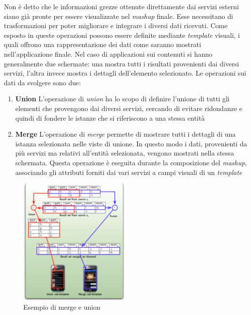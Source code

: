 Non è detto che le informazioni grezze ottenute direttamente dai servizi esterni siano già pronte per essere visualizzate nel \emph{mashup} finale. Esse necessitano di trasformazioni per poter migliorare e integrare i diversi dati ricevuti. Come esposto in \cite{caio2011tesi} queste operazioni possono essere definite mediante \emph{template} visuali, i quali offrono una rappresentazione dei dati come saranno mostrati nell'applicazione finale. Nel caso di applicazioni sui contenuti si hanno generalmente due schermate: una mostra tutti i risultati provenienti dai diversi servizi, l'altra invece mostra i dettagli dell'elemento selezionato. Le operazioni sui dati da svolgere sono due:

\begin{enumerate}
	\item \textbf{Union}
	L'operazione di \emph{union} ha lo scopo di definire l'unione di tutti gli elementi che provengono dai diversi servizi, cercando di evitare ridondanze e quindi di fondere le istanze che si riferiscono a una stessa entità
	\item \textbf{Merge}
	L'operazione di \emph{merge} permette di mostrare tutti i dettagli di una istanza selezionata nelle viste di unione. In questo modo i dati, provenienti da più servizi ma relativi all'entità selezionata, vengono mostrati nella stessa schermata. Questa operazione è eseguita durante la composizione del \emph{mashup}, associando gli attributi forniti dai vari servizi a campi visuali di un \emph{template}
\end{enumerate}

\begin{figure}[ht]
	\centering
	\includegraphics[width=0.5\textwidth]{2-preliminari/Immagini/merge-union.png}
	\caption{Esempio di merge e union}\label{fig:merge-union}
\end{figure}

